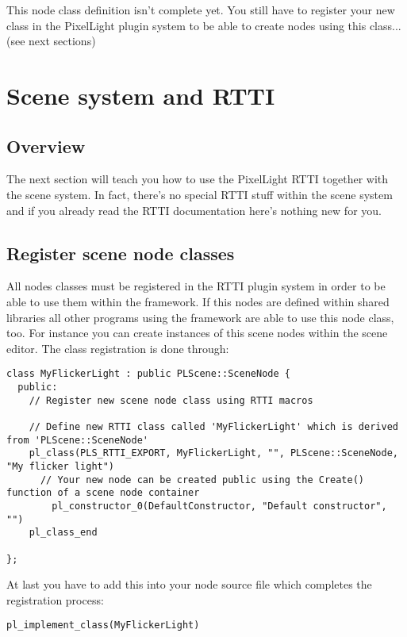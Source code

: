 This node class definition isn't complete yet. You still have to register your new class in the PixelLight plugin system to be able to create nodes using this class... (see next sections)




\section{Scene system and RTTI}


\subsection{Overview}
The next section will teach you how to use the PixelLight RTTI together with the scene system. In fact, there's no special RTTI stuff within the scene system and if you already read the RTTI documentation here's nothing new for you.


\subsection{Register scene node classes}
All nodes classes must be registered in the RTTI plugin system in order to be able to use them within the framework. If this nodes are defined within shared libraries all other programs using the framework are able to use this node class, too. For instance you can create instances of this scene nodes within the scene editor. The class registration is done through:

\begin{lstlisting}[caption=RTTI and own new scene node class]
class MyFlickerLight : public PLScene::SceneNode { 
  public:
    // Register new scene node class using RTTI macros

    // Define new RTTI class called 'MyFlickerLight' which is derived from 'PLScene::SceneNode'
	pl_class(PLS_RTTI_EXPORT, MyFlickerLight, "", PLScene::SceneNode, "My flicker light")
      // Your new node can be created public using the Create() function of a scene node container
		pl_constructor_0(DefaultConstructor, "Default constructor", "")
	pl_class_end

};
\end{lstlisting}

At last you have to add this into your node source file which completes the registration process:

\begin{lstlisting}[caption=Finishing RTTI class registration process]
pl_implement_class(MyFlickerLight)
\end{lstlisting}

